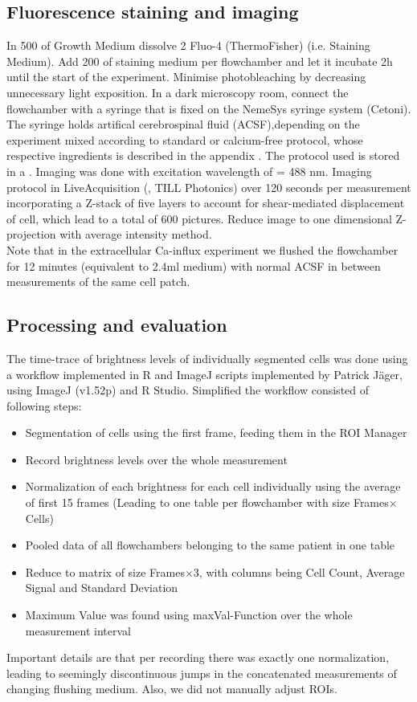 \subsection{Fluorescence staining and imaging}
In 500\mul{} of Growth Medium dissolve 2\mul{} Fluo-4 (ThermoFisher) (i.e. Staining Medium). Add 200\mul{} of staining medium per flowchamber and let it incubate 2h until the start of the experiment. 
Minimise photobleaching by decreasing unnecessary light exposition. In a dark microscopy room, connect the flowchamber with a syringe that is fixed on the NemeSys syringe system (Cetoni). The syringe holds artifical cerebrospinal fluid (ACSF),depending on the experiment mixed according to standard or calcium-free protocol, whose respective ingredients is described in the appendix . The protocol used is stored in a \myworries{}. Imaging was done with excitation wavelength of \textlambda = 488 nm. Imaging protocol in LiveAcquisition (, TILL Photonics) over 120 seconds per measurement incorporating a Z-stack of five layers to account for shear-mediated displacement of cell, which lead to a total of 600 pictures. Reduce image to one dimensional Z-projection with average intensity method.  \\
Note that in the extracellular Ca-influx experiment we flushed the flowchamber for 12 minutes (equivalent to 2.4ml medium) with normal ACSF in between measurements of the same cell patch.


\subsection{Processing and evaluation}

The time-trace of brightness levels of individually segmented cells was done using a workflow implemented in R and ImageJ scripts implemented by Patrick Jäger, using ImageJ (v1.52p) and R Studio. Simplified the workflow consisted of following steps:

\begin{itemize}
	\item Segmentation of cells using the first frame, feeding them in the ROI Manager
	\item Record brightness levels over the whole measurement
	\item Normalization of each brightness for each cell individually using the average of first 15 frames (Leading to one table per flowchamber with size Frames$\times$Cells)
	\item Pooled data of all flowchambers belonging to the same patient in one table
	\item Reduce to matrix of size Frames$\times$3, with columns being Cell Count, Average Signal and Standard Deviation
	\item Maximum Value was found using maxVal-Function over the whole measurement interval
\end{itemize}

Important details are that per recording there was exactly one normalization, leading to seemingly discontinuous jumps in the concatenated measurements of changing flushing medium. Also, we did not manually adjust ROIs. 



